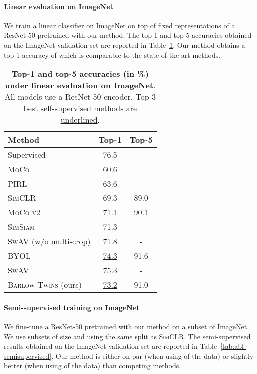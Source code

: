 \documentclass{article}
\newcommand{\AlgoName}{\textsc{Barlow Twins}}
\begin{document}
\paragraph{Linear evaluation on ImageNet}

We train a linear classifier on ImageNet on top of fixed representations of a ResNet-50 pretrained with our method. The top-1 and top-5 accuracies obtained on the ImageNet validation set are reported in Table~\ref{tab:abl-imagenet}. Our method obtains a top-1 accuracy of  which is comparable to the state-of-the-art methods.


\begin{table}[ht]
\caption{\textbf{Top-1 and top-5 accuracies (in \%) under linear evaluation on ImageNet}. All models use a ResNet-50 encoder. Top-3 best self-supervised methods are \underline{underlined}.} \label{tab:abl-imagenet}
\vskip 0.15in
\begin{center}
\begin{tabular}{lcc}
\toprule
Method  &  Top-1 & Top-5 \\
\midrule
Supervised & 76.5 & \\
\midrule
\textsc{MoCo}    & 60.6 & \\
\textsc{PIRL} & 63.6 & - \\
\textsc{SimCLR} & 69.3  & 89.0 \\
\textsc{MoCo v2} & 71.1 & 90.1 \\
\textsc{SimSiam} & 71.3 & - \\
\textsc{SwAV} (w/o multi-crop) & 71.8 & - \\
\textsc{BYOL} & \underline{74.3} & 91.6  \\
\textsc{SwAV} & \underline{75.3} & - \\
\AlgoName{} (ours) & \underline{73.2} & 91.0 \\
\bottomrule
\end{tabular}
\end{center}
\vskip -0.1in
\end{table}

\paragraph{Semi-supervised training on ImageNet}
We fine-tune a ResNet-50 pretrained with our method on a subset of ImageNet. We use subsets of size  and  using the same split as \textsc{SimCLR}. The semi-supervised results obtained on the ImageNet validation set are reported in Table~\ref{tab:abl-semisupervised}. Our method is either on par (when using  of the data) or slightly better (when using  of the data) than competing methods.
\end{document}
